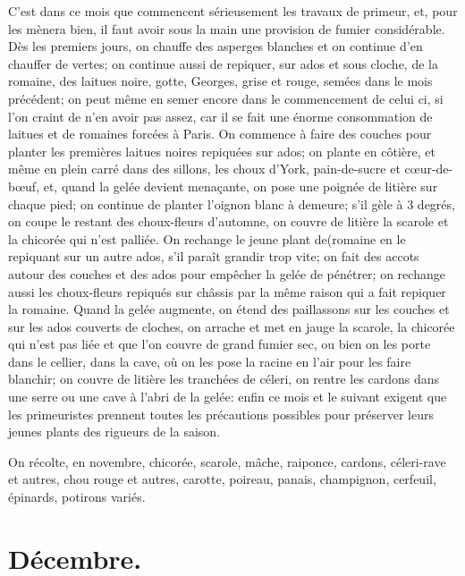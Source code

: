 \documentclass[10pt,a4paper]{book}
\begin{document}
C'est dans ce mois que commencent sérieusement les travaux de primeur, et, pour les mènera bien, il faut avoir sous la main une provision de fumier considérable. Dès les premiers jours, on chauffe des asperges blanches et on continue d'en chauffer de vertes; on continue aussi de repiquer, sur ados et sous cloche, de la romaine, des laitues noire, gotte, Georges, grise et rouge, semées dans le mois précédent; on peut même en semer encore dans le commencement de celui ci, si l'on craint de n'en avoir pas assez, car il se fait une énorme consommation de laitues et de romaines forcées à Paris. On commence à faire des couches pour planter les premières laitues noires repiquées sur ados; on plante en côtière, et même en plein carré dans des sillons, les choux d'York, pain-de-sucre et cœur-de-bœuf, et, quand la gelée devient menaçante, on pose une poignée de litière sur chaque pied; on continue de planter l'oignon blanc à demeure; s'il gèle à 3 degrés, on coupe le restant des choux-fleurs d'automne, on couvre de litière la scarole et la chicorée qui n'est palliée. On rechange le jeune plant de(romaine en le repiquant sur un autre ados, s'il paraît grandir trop vite; on fait des accots autour des couches et des ados pour empêcher la gelée de pénétrer; on rechange aussi les choux-fleurs repiqués sur châssis par la même raison qui a fait repiquer la romaine. Quand la gelée augmente, on étend des paillassons sur les couches et sur les ados couverts de cloches, on arrache et met en jauge la scarole, la chicorée qui n'est pas liée et que l'on couvre de grand fumier sec, ou bien on les porte dans le cellier, dans la cave, où on les pose la racine en l'air pour les faire blanchir; on couvre de litière les tranchées de céleri, on rentre les cardons dans une serre ou une cave à l'abri de la gelée: enfin ce mois et le suivant exigent que les primeuristes prennent toutes les précautions possibles pour préserver leurs jeunes plants des rigueurs de la saison.

On récolte, en novembre, chicorée, scarole, mâche, raiponce, cardons, céleri-rave et autres, chou rouge et autres, carotte, poireau, panais, champignon, cerfeuil, épinards, potirons variés.

\section{Décembre.}
\end{document}
